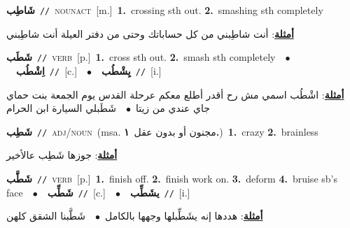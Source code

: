 \documentclass[10pt,a4paper,twoside]{article} %
\begin{document}
\begin{multicols}{2}
{\setlength\topsep{0pt}\textbf{\foreignlanguage{arabic}{شَاطِب}}\ {\color{gray}\texttt{//}\color{black}}\ \textsc{noun\textunderscore act}\ [m.]\ \textbf{1.}~crossing sth out.  \textbf{2.}~smashing sth completely\  \begin{flushright}\color{gray}\foreignlanguage{arabic}{\textbf{\underline{\foreignlanguage{arabic}{أمثلة}}}: أنت شاطِبني من كل حساباتك وحتى من دفتر العيلة أنت شاطِبني}\end{flushright}\color{black}} \vspace{2mm}

{\setlength\topsep{0pt}\textbf{\foreignlanguage{arabic}{شَطَب}}\ {\color{gray}\texttt{//}\color{black}}\ \textsc{verb}\ [p.]\ \textbf{1.}~cross sth out.  \textbf{2.}~smash sth completely\ \ $\bullet$\ \ \setlength\topsep{0pt}\textbf{\foreignlanguage{arabic}{اِشْطُب}}\ {\color{gray}\texttt{//}\color{black}}\ [c.]\ \ $\bullet$\ \ \setlength\topsep{0pt}\textbf{\foreignlanguage{arabic}{يِشْطُب}}\ {\color{gray}\texttt{//}\color{black}}\ [i.]\  \begin{flushright}\color{gray}\foreignlanguage{arabic}{\textbf{\underline{\foreignlanguage{arabic}{أمثلة}}}: اشْطُب اسمي مش رح أقدر أطلع معكم عرحلة القدس يوم الجمعة بنت حماي جاي عندي من زيتا\ $\bullet$\ \  شَطَبلي السيارة ابن الحرام}\end{flushright}\color{black}} \vspace{2mm}

{\setlength\topsep{0pt}\textbf{\foreignlanguage{arabic}{شَطِب}}\ {\color{gray}\texttt{//}\color{black}}\ \textsc{adj/noun}\ \color{gray}(msa. \foreignlanguage{arabic}{مجنون أو بدون عقل}~\foreignlanguage{arabic}{\textbf{١.}})\color{black}\ \textbf{1.}~crazy  \textbf{2.}~brainless\  \begin{flushright}\color{gray}\foreignlanguage{arabic}{\textbf{\underline{\foreignlanguage{arabic}{أمثلة}}}: جوزها شَطِب عالأخير}\end{flushright}\color{black}} \vspace{2mm}

{\setlength\topsep{0pt}\textbf{\foreignlanguage{arabic}{شَطَّب}}\ {\color{gray}\texttt{//}\color{black}}\ \textsc{verb}\ [p.]\ \textbf{1.}~finish off.  \textbf{2.}~finish work on.  \textbf{3.}~deform  \textbf{4.}~bruise sb's face\ \ $\bullet$\ \ \setlength\topsep{0pt}\textbf{\foreignlanguage{arabic}{شَطِّب}}\ {\color{gray}\texttt{//}\color{black}}\ [c.]\ \ $\bullet$\ \ \setlength\topsep{0pt}\textbf{\foreignlanguage{arabic}{يشَطِّب}}\ {\color{gray}\texttt{//}\color{black}}\ [i.]\  \begin{flushright}\color{gray}\foreignlanguage{arabic}{\textbf{\underline{\foreignlanguage{arabic}{أمثلة}}}: هددها إنه يشَطِّبلها وجهها بالكامل\ $\bullet$\ \  شَطَّبنا الشقق كلهن}\end{flushright}\color{black}} \vspace{2mm}


\end{multicols}
\end{document}
